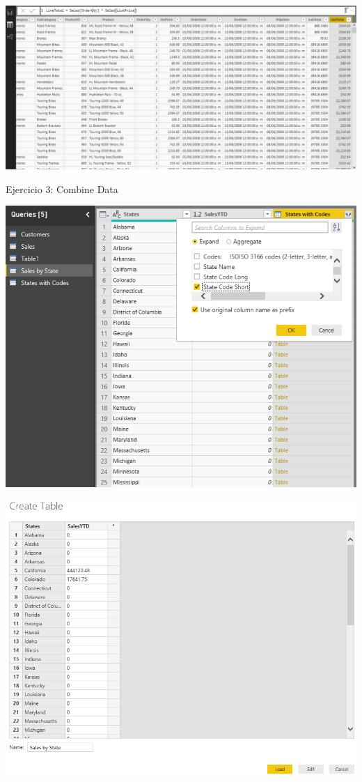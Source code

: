 	\begin{center}
	\includegraphics[width=15cm]{./images/power12}
	\end{center}	
\pagebreak
Ejercicio 3: Combine Data\\
	\begin{center}
	\includegraphics[width=15cm]{./images/power13}
	\end{center}	

	\begin{center}
	\includegraphics[width=15cm]{./images/power14}
	\end{center}	

